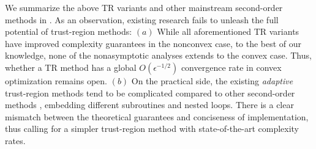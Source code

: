 We summarize the above TR variants and other mainstream second-order methods in . As an observation, existing research fails to unleash the full potential of trust-region methods:
$(a)$ \noindent While all aforementioned TR variants have improved complexity guarantees in the nonconvex case, to the best of our knowledge, none of the nonasymptotic analyses extends to the convex case.  Thus, whether a TR method has a global $O(\epsilon^{-1/2})$ convergence rate in convex optimization remains open. $(b)$ On the practical side, the existing \emph{adaptive} trust-region methods tend to be complicated compared to other second-order methods \citep{nesterov2006cubic,mishchenko_regularized_2023,zhang2022homogenous,he2023homogeneous}, embedding different subroutines and nested loops. There is a clear mismatch between the theoretical guarantees and conciseness of implementation, thus calling for a simpler trust-region method with state-of-the-art complexity rates.


